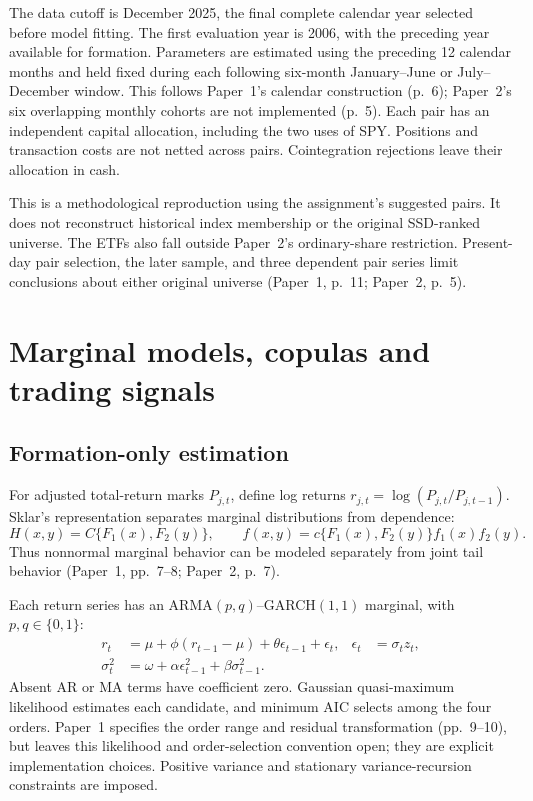 The data cutoff is December 2025, the final complete calendar year selected before
model fitting. The first evaluation year is 2006, with the preceding year available
for formation. Parameters are estimated using the preceding 12 calendar months
and held fixed during each following six-month January--June or July--December
window. This follows Paper~1's calendar construction (p.~6); Paper~2's six
overlapping monthly cohorts are not implemented (p.~5). Each pair has an independent
capital allocation, including the two uses of SPY. Positions and transaction costs
are not netted across pairs. Cointegration rejections leave their allocation in cash.

This is a methodological reproduction using the assignment's suggested pairs.
It does not reconstruct historical index membership or the original SSD-ranked
universe. The ETFs also fall outside Paper~2's ordinary-share restriction. Present-day
pair selection, the later sample, and three dependent pair series limit conclusions
about either original universe (Paper~1, p.~11; Paper~2, p.~5).

\section{Marginal models, copulas and trading signals}

\subsection{Formation-only estimation}

For adjusted total-return marks $P_{j,t}$, define log returns
$r_{j,t}=\log(P_{j,t}/P_{j,t-1})$. Sklar's representation separates marginal
distributions from dependence:
\begin{equation}
 H(x,y)=C\{F_1(x),F_2(y)\},\qquad
 f(x,y)=c\{F_1(x),F_2(y)\}f_1(x)f_2(y).
\end{equation}
Thus nonnormal marginal behavior can be modeled separately from joint tail
behavior (Paper~1, pp.~7--8; Paper~2, p.~7).

Each return series has an ARMA$(p,q)$--GARCH$(1,1)$ marginal, with
$p,q\in\{0,1\}$:
\begin{align}
 r_t&=\mu+\phi(r_{t-1}-\mu)+\theta\epsilon_{t-1}+\epsilon_t,
 &\epsilon_t&=\sigma_t z_t,\\
 \sigma_t^2&=\omega+\alpha\epsilon_{t-1}^2+\beta\sigma_{t-1}^2.
\end{align}
Absent AR or MA terms have coefficient zero. Gaussian quasi-maximum likelihood
estimates each candidate, and minimum AIC selects among the four orders.
Paper~1 specifies the order range and residual transformation (pp.~9--10), but
leaves this likelihood and order-selection convention open; they are explicit
implementation choices. Positive variance and stationary variance-recursion
constraints are imposed.

